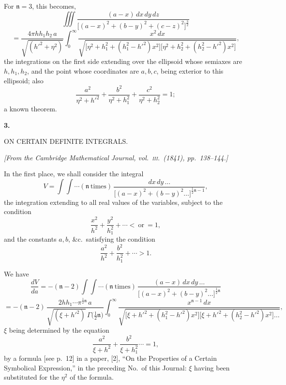 \documentclass[11pt]{article}
\begin{document}
\medskip

For $\mathfrak{n} = 3$, this becomes,
\[
\iiint \frac{(a - x)\,dx\,dy\,dz}{\bigl[(a - x)^{2} + (b - y)^{2} + (c - z)^{2}\bigr]^{\frac{3}{2}}}
\]
\[
= \frac{4\pi hh_{1}h_{2}\,a}{\sqrt{(h'^{2} + \eta^{2})}}\int_{0}^{\infty}\frac{x^{2}\,dx}{\sqrt{\bigl[\eta^{2} + h_{1}^{2} + (h_{1}^{2} - h'^{2})x^{2}\bigr]\bigl[\eta^{2} + h_{2}^{2} + (h_{2}^{2} - h'^{2})x^{2}\bigr]}},
\]
the integrations on the first side extending over the ellipsoid whose semiaxes are $h, h_{1}, h_{2}$, and the point whose coordinates are $a, b, c$, being exterior to this ellipsoid; also
\[
\frac{a^{2}}{\eta^{2} + h'^{2}} + \frac{b^{2}}{\eta^{2} + h_{1}^{2}} + \frac{c^{2}}{\eta^{2} + h_{2}^{2}} = 1;
\]
a known theorem.

\clearpage


\begin{center}
{\Large\textbf{3.}}\par
\bigskip
{\Large ON CERTAIN DEFINITE INTEGRALS.}
\end{center}

\medskip
\begin{center}
\textit{[From the Cambridge Mathematical Journal, vol.\ \textsc{iii}.\ (1841), pp.~138--144.]}
\end{center}

\bigskip

\noindent In the first place, we shall consider the integral
\[
V = \int\!\!\int \cdots (\mathfrak{n}\ \text{times})\,\frac{dx\,dy\,\ldots}{\bigl[(a - x)^{2} + (b - y)^{2}\ldots\bigr]^{\frac{1}{2}\mathfrak{n} - 1}},
\]
the integration extending to all real values of the variables, subject to the condition
\[
\frac{x^{2}}{h^{2}} + \frac{y^{2}}{h_{1}^{2}} + \cdots <\ \text{or}\ = 1,
\]
and the constants $a, b$, \&c.\ satisfying the condition
\[
\frac{a^{2}}{h^{2}} + \frac{b^{2}}{h_{1}^{2}} + \cdots > 1.
\]

We have
\[
\frac{dV}{da} = -(\mathfrak{n} - 2)\int\!\!\int \cdots (\mathfrak{n}\ \text{times})\,\frac{(a - x)\,dx\,dy\,\ldots}{\bigl[(a - x)^{2} + (b - y)^{2}\ldots\bigr]^{\frac{1}{2}\mathfrak{n}}}
\]
\[
= -(\mathfrak{n} - 2)\,\frac{2hh_{1}\cdots\pi^{\frac{1}{2}\mathfrak{n}}\,a}{\sqrt{(\xi + h'^{2})}\,\Gamma\bigl(\tfrac{1}{2}\mathfrak{n}\bigr)}\int_{0}^{\infty}\frac{x^{\mathfrak{n} - 1}\,dx}{\sqrt{\bigl[\xi + h'^{2} + (h_{1}^{2} - h'^{2})x^{2}\bigr]\bigl[\xi + h'^{2} + (h_{2}^{2} - h'^{2})x^{2}\bigr]\ldots}},
\]
$\xi$ being determined by the equation
\[
\frac{a^{2}}{\xi + h^{2}} + \frac{b^{2}}{\xi + h_{1}^{2}}\cdots = 1,
\]
by a formula [see p.~12] in a paper, [2], ``On the Properties of a Certain Symbolical Expression,'' in the preceding No.\ of this Journal: $\xi$ having been substituted for the $\eta^{2}$ of the formula.
\end{document}
